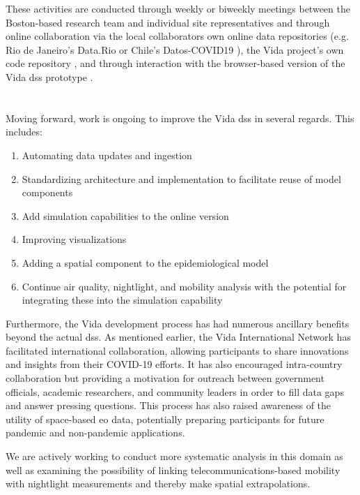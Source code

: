These activities are conducted through weekly or biweekly meetings between the Boston-based research team and individual site representatives and through online collaboration via the local collaborators own online data repositories (e.g. Rio de Janeiro's Data.Rio \cite{institutopereirapassosDataRio2017} or Chile's Datos-COVID19 \cite{ministeriodecienciatecnologiaconocimientoeinnovacionDatosCOVID192021}), the Vida project's own code repository \cite{reidMITVidaRepository2021}, and through interaction with the browser-based version of the Vida \ac{dss} prototype \cite{bluerasterMITVidaSupportBoston2021}.

\section{} \label{sec:vida-discuss}

Moving forward, work is ongoing to improve the Vida \ac{dss} in several regards. This includes:

\begin{enumerate}
    \item Automating data updates and ingestion
    \item Standardizing architecture and implementation to facilitate reuse of model components
    \item Add simulation capabilities to the online version
    \item Improving visualizations
    \item Adding a spatial component to the epidemiological model
    \item Continue air quality, nightlight, and mobility analysis with the potential for integrating these into the simulation capability
\end{enumerate}

Furthermore, the Vida development process has had numerous ancillary benefits beyond the actual \ac{dss}. As mentioned earlier, the Vida International Network has facilitated international collaboration, allowing participants to share innovations and insights from their COVID-19 efforts. It has also encouraged intra-country collaboration but providing a motivation for outreach between government officials, academic researchers, and community leaders in order to fill data gaps and answer pressing questions. This process has also raised awareness of the utility of space-based \ac{eo} data, potentially preparing participants for future pandemic and non-pandemic applications. 

We are actively working to conduct more systematic analysis in this domain as well as examining the possibility of linking telecommunications-based mobility with nightlight measurements and thereby make spatial extrapolations.

\section{} \label{sec:vida-concl}

